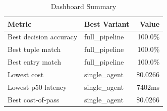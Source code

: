 \begin{table}[htbp]
\centering
\caption{Dashboard Summary}
\label{tab:summary}
\begin{tabular}{l l r}
\toprule
Metric & Best Variant & Value \\
\midrule
  Best decision accuracy & full\_pipeline & 100.0\% \\
  Best tuple match & full\_pipeline & 100.0\% \\
  Best entry match & full\_pipeline & 100.0\% \\
  Lowest cost & single\_agent & \$0.0266 \\
  Lowest p50 latency & single\_agent & 7402ms \\
  Best cost-of-pass & single\_agent & \$0.0266 \\
\bottomrule
\end{tabular}
\end{table}
